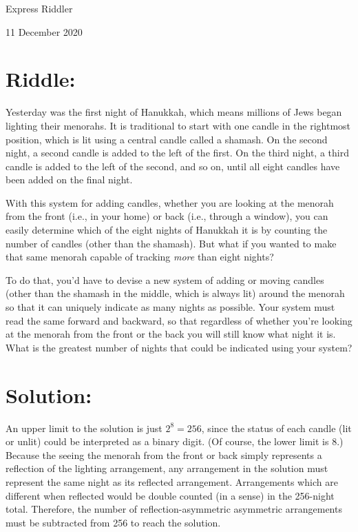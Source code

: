 \documentclass{article}
\begin{document}
\pagestyle{empty} %

\begin{center}
{\LARGE Express Riddler}

\vspace{0.15in}

{\Large 11 December 2020}
\end{center}


\section*{Riddle:}

Yesterday was the first night of Hanukkah, which means millions of Jews began lighting their menorahs.
It is traditional to start with one candle in the rightmost position, which is lit using a central candle called a shamash.
On the second night, a second candle is added to the left of the first.
On the third night, a third candle is added to the left of the second, and so on, until all eight candles have been added on the final night.

With this system for adding candles, whether you are looking at the menorah from the front (i.e., in your home) or back (i.e., through a window), you can easily determine which of the eight nights of Hanukkah it is by counting the number of candles (other than the shamash).
But what if you wanted to make that same menorah capable of tracking \textit{more} than eight nights?

To do that, you'd have to devise a new system of adding or moving candles (other than the shamash in the middle, which is always lit) around the menorah so that it can uniquely indicate as many nights as possible.
Your system must read the same forward and backward, so that regardless of whether you're looking at the menorah from the front or the back you will still know what night it is.
What is the greatest number of nights that could be indicated using your system?


\section*{Solution:}

An upper limit to the solution is just $2^{8}=256$, since the status of each candle (lit or unlit) could be interpreted as a binary digit.
(Of course, the lower limit is 8.)
Because the seeing the menorah from the front or back simply represents a reflection of the lighting arrangement, any arrangement in the solution must represent the same night as its reflected arrangement.
Arrangements which are different when reflected would be double counted (in a sense) in the 256-night total.
Therefore, the number of reflection-asymmetric asymmetric arrangements must be subtracted from 256 to reach the solution.
\end{document}
